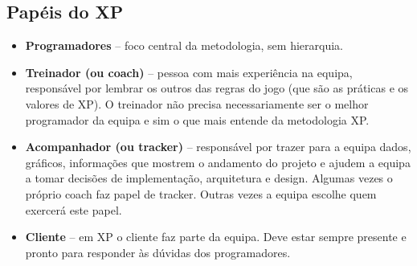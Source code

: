 \subsection{Papéis do XP}
\begin{itemize}
    \item \textbf{Programadores} – foco central da metodologia, sem hierarquia.
    
    \item \textbf{Treinador (ou coach)} – pessoa com mais experiência na equipa, responsável por lembrar os outros das regras do jogo (que são as práticas e os valores de XP). O treinador não precisa necessariamente ser o melhor programador da equipa e sim o que mais entende da metodologia XP.
    
    \item \textbf{Acompanhador (ou tracker)} – responsável por trazer para a equipa dados, gráficos, informações que mostrem o andamento do projeto e ajudem a equipa a tomar decisões de implementação, arquitetura e design. Algumas vezes o próprio coach faz papel de tracker. Outras vezes a equipa escolhe quem exercerá este papel.
    
    \item \textbf{Cliente} – em XP o cliente faz parte da equipa. Deve estar sempre presente e pronto para responder às dúvidas dos programadores.

\end{itemize}

